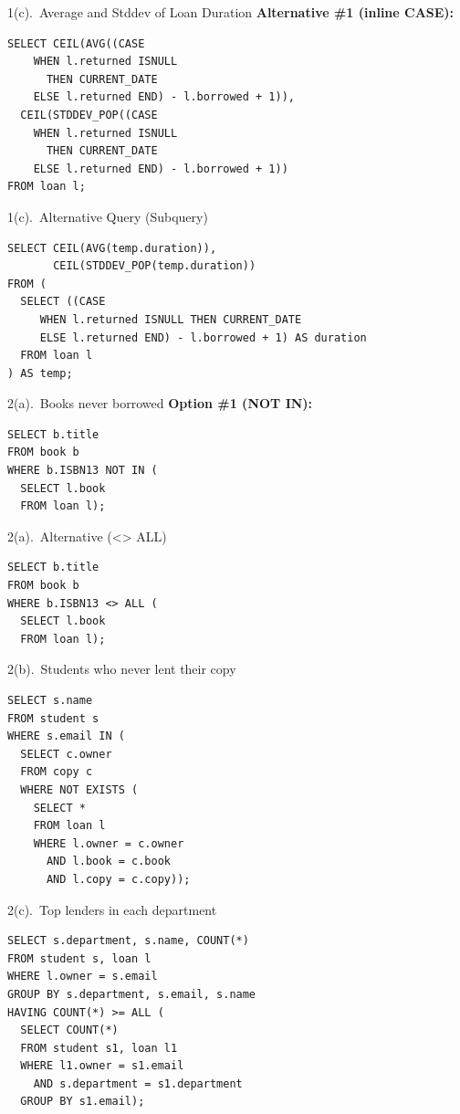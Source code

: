 \documentclass{beamer}
\begin{document}
\begin{frame}[fragile]{1(c).\ Average and Stddev of Loan Duration}
\textbf{Alternative \#1 (inline CASE):}
\begin{lstlisting}
SELECT CEIL(AVG((CASE
    WHEN l.returned ISNULL
      THEN CURRENT_DATE
    ELSE l.returned END) - l.borrowed + 1)),
  CEIL(STDDEV_POP((CASE
    WHEN l.returned ISNULL
      THEN CURRENT_DATE
    ELSE l.returned END) - l.borrowed + 1))
FROM loan l;
\end{lstlisting}
\end{frame}

\begin{frame}[fragile]{1(c).\ Alternative Query (Subquery)}
\begin{lstlisting}
SELECT CEIL(AVG(temp.duration)),
       CEIL(STDDEV_POP(temp.duration))
FROM (
  SELECT ((CASE
     WHEN l.returned ISNULL THEN CURRENT_DATE
     ELSE l.returned END) - l.borrowed + 1) AS duration
  FROM loan l
) AS temp;
\end{lstlisting}
\end{frame}

\begin{frame}[fragile]{2(a).\ Books never borrowed}
\textbf{Option \#1 (NOT IN):}
\begin{lstlisting}
SELECT b.title
FROM book b
WHERE b.ISBN13 NOT IN (
  SELECT l.book
  FROM loan l);
\end{lstlisting}
\end{frame}

\begin{frame}[fragile]{2(a).\ Alternative (<> ALL)}
\begin{lstlisting}
SELECT b.title
FROM book b
WHERE b.ISBN13 <> ALL (
  SELECT l.book
  FROM loan l);
\end{lstlisting}
\end{frame}

\begin{frame}[fragile]{2(b).\ Students who never lent their copy}
\begin{lstlisting}
SELECT s.name
FROM student s
WHERE s.email IN (
  SELECT c.owner
  FROM copy c
  WHERE NOT EXISTS (
    SELECT *
    FROM loan l
    WHERE l.owner = c.owner
      AND l.book = c.book
      AND l.copy = c.copy));
\end{lstlisting}
\end{frame}

\begin{frame}[fragile]{2(c).\ Top lenders in each department}
\begin{lstlisting}
SELECT s.department, s.name, COUNT(*)
FROM student s, loan l
WHERE l.owner = s.email
GROUP BY s.department, s.email, s.name
HAVING COUNT(*) >= ALL (
  SELECT COUNT(*)
  FROM student s1, loan l1
  WHERE l1.owner = s1.email
    AND s.department = s1.department
  GROUP BY s1.email);
\end{lstlisting}
\end{frame}
\end{document}
